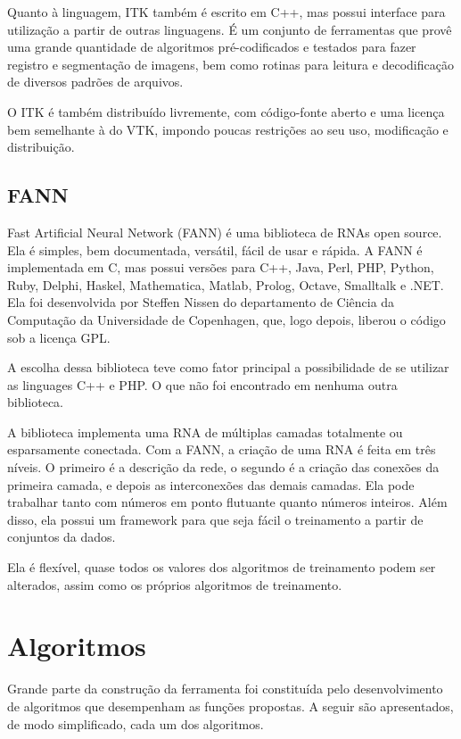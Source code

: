 Quanto à linguagem, ITK também é escrito em C++, mas possui interface para utilização a partir de outras linguagens. É um conjunto de ferramentas que provê uma grande quantidade de algoritmos pré-codificados e testados para fazer registro e segmentação de imagens, bem como rotinas para leitura e decodificação de diversos padrões de arquivos.

O ITK é também distribuído livremente, com código-fonte aberto e uma licença bem semelhante à do VTK, impondo poucas restrições ao seu uso, modificação e distribuição.

\subsection{FANN}

Fast Artificial Neural Network (FANN) é uma biblioteca de RNAs open source. Ela é simples, bem documentada, versátil, fácil de usar e rápida. A FANN é implementada em C, mas possui versões para C++, Java, Perl, PHP, Python, Ruby, Delphi, Haskel, Mathematica, Matlab, Prolog, Octave, Smalltalk e .NET. Ela foi desenvolvida por Steffen Nissen do departamento de Ciência da Computação da Universidade de Copenhagen, que, logo depois, liberou o código sob a licença GPL.

A escolha dessa biblioteca teve como fator principal a possibilidade de se utilizar as linguages C++ e PHP. O que não foi encontrado em nenhuma outra biblioteca.

A biblioteca implementa uma RNA de múltiplas camadas totalmente ou esparsamente conectada. Com a FANN, a criação de uma RNA é feita em três níveis. O primeiro é a descrição da rede, o segundo é a criação das conexões da primeira camada, e depois as interconexões das demais camadas. Ela pode trabalhar tanto com números em ponto flutuante quanto números inteiros. Além disso, ela possui um framework para que seja fácil o treinamento a partir de conjuntos da dados.

Ela é flexível, quase todos os valores dos algoritmos de treinamento podem ser alterados, assim como os próprios algoritmos de treinamento.

\section{Algoritmos}

Grande parte da construção da ferramenta foi constituída pelo desenvolvimento de algoritmos que desempenham as funções propostas. A seguir são apresentados, de modo simplificado, cada um dos algoritmos.


